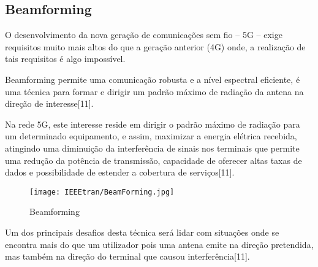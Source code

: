 \documentclass[conference]{IEEEtran}
\begin{document}
\subsection{Beamforming}
O desenvolvimento da nova geração de comunicações sem fio – 5G – exige requisitos muito mais altos do que a geração anterior (4G) onde, a realização de tais requisitos é algo impossível.\par
Beamforming permite uma comunicação robusta e a nível espectral eficiente, é uma técnica para formar e dirigir um padrão máximo de radiação da antena na direção de interesse[11]. \par
Na rede 5G, este interesse reside em dirigir o padrão máximo de radiação para um determinado equipamento, e assim, maximizar a energia elétrica recebida, atingindo uma diminuição da interferência de sinais nos terminais que permite uma redução da potência de transmissão, capacidade de oferecer altas taxas de dados e possibilidade de estender a cobertura de serviços[11].
\begin{figure}[ht]
    \centering
    \texttt{[image: IEEEtran/BeamForming.jpg]}
    \caption{Beamforming}
\end{figure}
Um dos principais desafios desta técnica será lidar com situações onde se encontra mais do que um utilizador pois uma antena emite na direção pretendida, mas também na direção do terminal que causou interferência[11].
\end{document}
